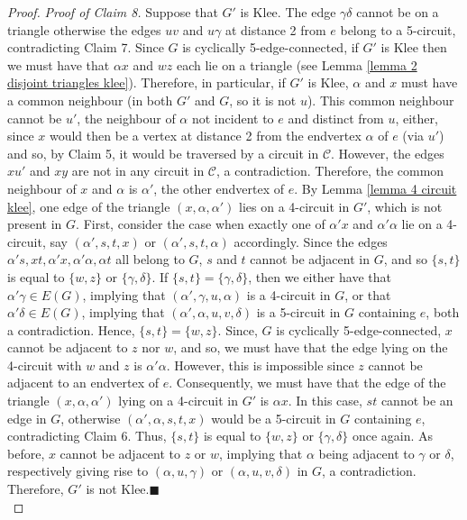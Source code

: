 \documentclass[]{theclass}
\begin{document}
\begin{proof}
\noindent\emph{Proof of Claim 8.} Suppose that $G'$ is Klee. The edge $\gamma\delta$ cannot be on a triangle otherwise the edges $uv$ and $u\gamma$ at distance 2 from $e$ belong to a 5-circuit, contradicting Claim 7. Since $G$ is cyclically 5-edge-connected, if $G'$ is Klee then we must have that $\alpha x$ and $wz$ each lie on a triangle (see Lemma \ref{lemma 2 disjoint triangles klee}). Therefore, in particular, if $G'$ is Klee, $\alpha$ and $x$ must have a common neighbour (in both $G'$ and $G$, so it is not $u$). 
This common neighbour cannot be $u'$, the neighbour of $\alpha$ not incident to $e$ and distinct from $u$, either, since $x$ would then be a vertex at distance 2 from the endvertex $\alpha$ of $e$ (via $u'$) and so, by Claim 5, it would be traversed by a circuit in $\mathcal{C}$. However, the edges $xu'$ and $xy$ are not in any circuit in $\mathcal{C}$, a contradiction.
Therefore, the common neighbour of $x$ and $\alpha$ is $\alpha'$, the other endvertex of $e$.
By Lemma \ref{lemma 4 circuit klee}, one edge of the triangle $(x,\alpha,\alpha')$ lies on a 4-circuit in $G'$, which is not present in $G$. First, consider the case when exactly one of $\alpha'x$ and $\alpha'\alpha$ lie on a 4-circuit, say $(\alpha', s,t,x)$ or $(\alpha', s,t,\alpha)$ accordingly. Since the edges $\alpha's, xt,\alpha'x,\alpha'\alpha, \alpha t$ all belong to $G$, $s$ and $t$ cannot be adjacent in $G$, and so $\{s,t\}$ is equal to $\{w,z\}$ or $\{\gamma,\delta\}$. If $\{s,t\}=\{\gamma,\delta\}$, then we either have that $\alpha'\gamma\in E(G)$, implying that $(\alpha',\gamma,u,\alpha)$ is a 4-circuit in $G$, or that $\alpha'\delta\in E(G)$, implying that $(\alpha',\alpha,u,v,\delta)$ is a 5-circuit in $G$ containing $e$, both a contradiction. Hence, $\{s,t\}=\{w,z\}$. Since, $G$ is cyclically 5-edge-connected, $x$ cannot be adjacent to $z$ nor $w$, and so, we must have that the edge lying on the 4-circuit with $w$ and $z$ is $\alpha'\alpha$. However, this is impossible since $z$ cannot be adjacent to an endvertex of $e$. Consequently, we must have that the edge of the triangle $(x,\alpha,\alpha')$ lying on a 4-circuit in $G'$ is $\alpha x$. In this case, $st$ cannot be an edge in $G$, otherwise $(\alpha', \alpha, s,t,x)$ would be a 5-circuit in $G$ containing $e$, contradicting Claim 6. Thus, $\{s,t\}$ is equal to $\{w,z\}$ or $\{\gamma,\delta\}$ once again. As before, $x$ cannot be adjacent to $z$ or $w$, implying that $\alpha$ being adjacent to $\gamma$ or $\delta$, respectively giving rise to $(\alpha,u,\gamma)$ or $(\alpha, u, v, \delta)$  in $G$, a contradiction. Therefore, $G'$ is not Klee.\hfill {\tiny$\blacksquare$}\\ 



\end{proof}
\end{document}
